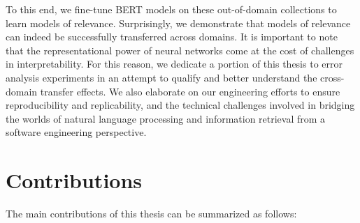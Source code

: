To this end, we fine-tune BERT models on these out-of-domain collections to learn models of relevance.
Surprisingly, we demonstrate that models of relevance can indeed be successfully transferred across domains.
It is important to note that the representational power of neural networks come at the cost of challenges in interpretability.
For this reason, we dedicate a portion of this thesis to error analysis experiments in an attempt to qualify and better understand the cross-domain transfer effects.
We also elaborate on our engineering efforts to ensure reproducibility and replicability, and the technical challenges involved in bridging the worlds of natural language processing and information retrieval from a software engineering perspective.

\newpage

\section{Contributions}

The main contributions of this thesis can be summarized as follows:\\

